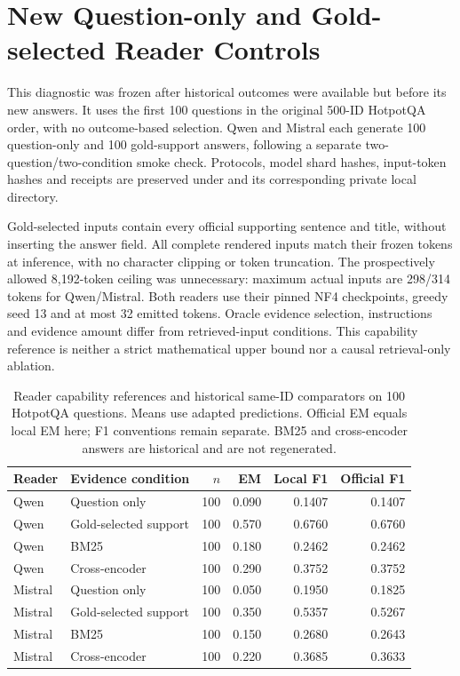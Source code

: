 \section{New Question-only and Gold-selected Reader Controls}
\label{sec:supp_reader_controls_new}
This diagnostic was frozen after historical outcomes were available but before its new answers. It uses the first 100 questions in the original 500-ID HotpotQA order, with no outcome-based selection. Qwen and Mistral each generate 100 question-only and 100 gold-support answers, following a separate two-question/two-condition smoke check. Protocols, model shard hashes, input-token hashes and receipts are preserved under  and its corresponding private local directory.

Gold-selected inputs contain every official supporting sentence and title, without inserting the answer field. All complete rendered inputs match their frozen tokens at inference, with no character clipping or token truncation. The prospectively allowed 8,192-token ceiling was unnecessary: maximum actual inputs are 298/314 tokens for Qwen/Mistral. Both readers use their pinned NF4 checkpoints, greedy seed 13 and at most 32 emitted tokens. Oracle evidence selection, instructions and evidence amount differ from retrieved-input conditions. This capability reference is neither a strict mathematical upper bound nor a causal retrieval-only ablation.

\begin{table}[htbp]
\centering\footnotesize
\caption{Reader capability references and historical same-ID comparators on 100 HotpotQA questions. Means use adapted predictions. Official EM equals local EM here; F1 conventions remain separate. BM25 and cross-encoder answers are historical and are not regenerated.}
\label{tab:priority_reader_controls}
\begin{tabularx}{\textwidth}{l X r r r r}
\toprule
Reader & Evidence condition & $n$ & EM & Local F1 & Official F1 \\
\midrule
Qwen & Question only & 100 & 0.090 & 0.1407 & 0.1407 \\
Qwen & Gold-selected support & 100 & 0.570 & 0.6760 & 0.6760 \\
Qwen & BM25 & 100 & 0.180 & 0.2462 & 0.2462 \\
Qwen & Cross-encoder & 100 & 0.290 & 0.3752 & 0.3752 \\
\midrule
Mistral & Question only & 100 & 0.050 & 0.1950 & 0.1825 \\
Mistral & Gold-selected support & 100 & 0.350 & 0.5357 & 0.5267 \\
Mistral & BM25 & 100 & 0.150 & 0.2680 & 0.2643 \\
Mistral & Cross-encoder & 100 & 0.220 & 0.3685 & 0.3633 \\
\bottomrule
\end{tabularx}
\end{table}

